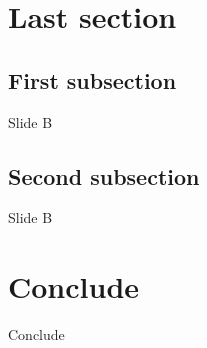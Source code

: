 \documentclass{beamer}
\begin{document}
	\section{Last section}
	\subsection{First subsection}
	\begin{frame}{Slide B}
	\end{frame}
	\subsection{Second subsection}
	\begin{frame}{Slide B}
	\end{frame}
	\section*{Conclude}
	\begin{frame}{Conclude}
	\end{frame}

	\begin{frame}
		\titlepage
	\end{frame}
\end{document}
